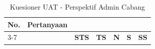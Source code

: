 \begin{longtable}{|p{0.8cm}|p{7.5cm}|>{\centering\arraybackslash}p{0.8cm}|>{\centering\arraybackslash}p{0.8cm}|>{\centering\arraybackslash}p{0.8cm}|>{\centering\arraybackslash}p{0.8cm}|>{\centering\arraybackslash}p{0.8cm}|}
    \caption{Kuesioner UAT - Perspektif Admin Cabang} \label{tabel:uat_admin_cabang}                                                                                                                                                                                                   \\
    \hline
    \multirow{2}{*}{\textbf{No.}}              & \multirow{2}{*}{\textbf{Pertanyaan}}                                                                                                    & \multicolumn{5}{c|}{\textbf{Jawaban}}                                                       \\ \cline{3-7}
                                               &                                                                                                                                         & \textbf{STS}                          & \textbf{TS} & \textbf{N} & \textbf{S} & \textbf{SS} \\
    \hline
    \endfirsthead




\end{longtable}

